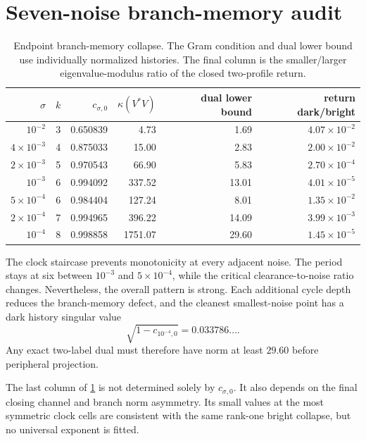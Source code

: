 \documentclass[11pt]{article}
\theoremstyle{definition}
\theoremstyle{remark}
\begin{document}
\section{Seven-noise branch-memory audit}
\label{sec:seven-noise}

\begin{table}[H]
\centering
\small
\caption{Endpoint branch-memory collapse.  The Gram condition and dual lower
bound use individually normalized histories.  The final column is the
smaller/larger eigenvalue-modulus ratio of the closed two-profile return.}
\label{tab:memory-collapse}
\begin{tabular}{rrrrrr}
\toprule
$\sigma$ & $k$ & $c_{\sigma,0}$ & $\kappa(V^*V)$
& dual lower bound & return dark/bright\\
\midrule
$10^{-2}$        &3&0.650839&4.73&1.69&$4.07\times10^{-2}$\\
$4\times10^{-3}$ &4&0.875033&15.00&2.83&$2.00\times10^{-2}$\\
$2\times10^{-3}$ &5&0.970543&66.90&5.83&$2.70\times10^{-4}$\\
$10^{-3}$        &6&0.994092&337.52&13.01&$4.01\times10^{-5}$\\
$5\times10^{-4}$ &6&0.984404&127.24&8.01&$1.35\times10^{-2}$\\
$2\times10^{-4}$ &7&0.994965&396.22&14.09&$3.99\times10^{-3}$\\
$10^{-4}$        &8&0.998858&1751.07&29.60&$1.45\times10^{-5}$\\
\bottomrule
\end{tabular}
\end{table}

The clock staircase prevents monotonicity at every adjacent noise.  The
period stays at six between $10^{-3}$ and $5\times10^{-4}$, while the
critical clearance-to-noise ratio changes.  Nevertheless, the overall
pattern is strong.  Each additional cycle depth reduces the branch-memory
defect, and the cleanest smallest-noise point has a dark history singular
value
\begin{equation}\label{eq:smallest-dark-singular}
 \sqrt{1-c_{10^{-4},0}}=0.033786\ldots.
\end{equation}
Any exact two-label dual must therefore have norm at least $29.60$ before
peripheral projection.

The last column of \cref{tab:memory-collapse} is not determined solely by
$c_{\sigma,0}$.  It also depends on the final closing channel and branch norm
asymmetry.  Its small values at the most symmetric clock cells are consistent
with the same rank-one bright collapse, but no universal exponent is fitted.
\end{document}
